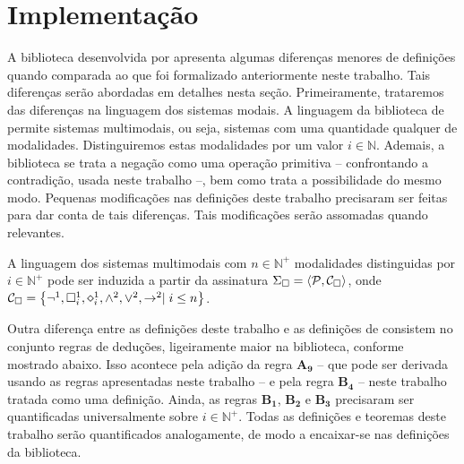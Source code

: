 \chapter{Implementação} 

A biblioteca desenvolvida por \cite{Silveira} apresenta algumas diferenças menores de definições quando comparada ao que foi formalizado anteriormente neste trabalho.
Tais diferenças serão abordadas em detalhes nesta seção.
Primeiramente, trataremos das diferenças na linguagem dos sistemas modais.
A linguagem da biblioteca de \cite{Silveira} permite sistemas multimodais, ou seja, sistemas com uma quantidade qualquer de modalidades.
Distinguiremos estas modalidades por um valor $i\in\mathbb{N}$.
Ademais, a biblioteca se \cite{Silveira} trata a negação como uma operação primitiva -- confrontando a contradição, usada neste trabalho --, bem como trata a possibilidade do mesmo modo.
Pequenas modificações nas definições deste trabalho precisaram ser feitas para dar conta de tais diferenças.
Tais modificações serão assomadas quando relevantes.

\begin{definition}
    A linguagem dos sistemas multimodais com $n\in\mathbb{N}^+$ modalidades distinguidas por $i\in\mathbb{N}^+$ pode ser induzida a partir da assinatura $\Sigma_{\Box}=\langle\mathcal{P},\mathcal{C}_{\Box}\rangle$, onde $\mathcal{C}_{\nec}=\set{\neg^1,\nec^1_i,\pos^1_i,\wedge^2,\vee^2,\to^2\mid i\leq n}$.
\end{definition}

Outra diferença entre as definições deste trabalho e as definições de \cite{Silveira} consistem no conjunto regras de deduções, ligeiramente maior na biblioteca, conforme mostrado abaixo.
Isso acontece pela adição da regra $\mathbf{A_9}$ -- que pode ser derivada usando as regras apresentadas neste trabalho -- e pela regra $\mathbf{B_4}$ -- neste trabalho tratada como uma definição.
Ainda, as regras $\mathbf{B_1}$, $\mathbf{B_2}$ e $\mathbf{B_3}$ precisaram ser quantificadas universalmente sobre $i\in\mathbb{N}^+$.
Todas as definições e teoremas deste trabalho serão quantificados analogamente, de modo a encaixar-se nas definições da biblioteca.

